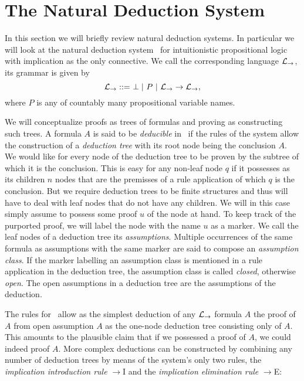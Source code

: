 \section{The Natural Deduction System \implnpi}
\label{sec:naturaldeduction}


In this section we will briefly review natural deduction systems. In particular
we will look at the natural deduction system \implnpi\ for intuitionistic
propositional logic with implication as the only connective. We call the
corresponding language $\mathcal{L}_\to$, its grammar is given by
$$\mathcal{L}_\to ::=\ \perp |\ P\ |\ \mathcal{L}_\to \to \mathcal{L}_\to,$$
where $P$ is any of countably many propositional variable names.

We will conceptualize proofs as trees of formulas and proving as constructing
such trees. A formula $A$ is said to be \textit{deducible} in \implnpi\ if the
rules of the system allow the construction of a \textit{deduction tree} with its
root node being the conclusion $A$. We would like for every node of the
deduction tree to be proven by the subtree of which it is the conclusion. This
is easy for any non-leaf node $q$ if it possesses as its children $n$ nodes that
are the premisses of a rule application of which $q$ is the conclusion. But we
require deduction trees to be finite structures and thus will have to deal with
leaf nodes that do not have any children. We will in this case simply assume to
possess some proof $u$ of the node at hand. To keep track of the purported
proof, we will label the node with the name $u$ as a marker. We call the leaf
nodes of a deduction tree its \textit{assumptions}. Multiple occurrences of the
same formula as assumptions with the same marker are said to compose an
\textit{assumption class}. If the marker labelling an assumption class is
mentioned in a rule application in the deduction tree, the assumption class is
called \textit{closed}, otherwise \textit{open}. The open assumptions in a
deduction tree are the assumptions of the deduction.

The rules for \implnpi\ allow as the simplest deduction of any $\mathcal{L}_\to$ formula
$A$ the proof of $A$ from open assumption $A$ as the one-node deduction tree
consisting only of $A$. This amounts to the plausible claim that if we possessed
a proof of $A$, we could indeed proof $A$. More complex deductions can be
constructed by combining any number of deduction trees by means of the system's
only two rules, the \textit{implication introduction rule} $\to$I and the
\textit{implication elimination rule} $\to$E:

